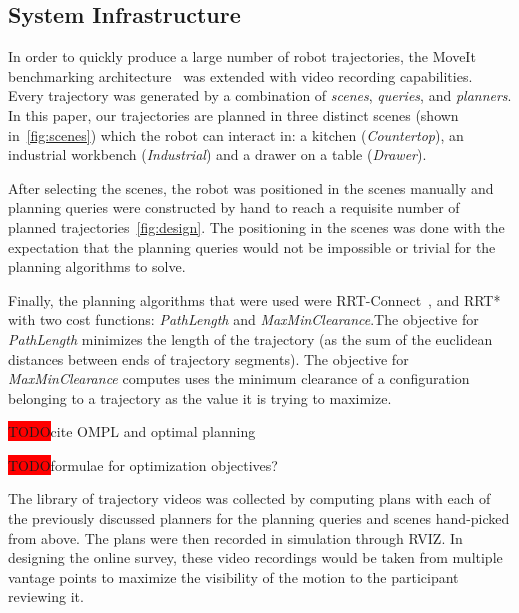 \documentclass[letterpaper, 10 pt, conference]{ieeeconf}  %
\newcommand{\todo}{\colorbox{red}{TODO}}
\begin{document}
\subsection{System Infrastructure}

In order to quickly produce a large number of robot trajectories, the MoveIt benchmarking architecture~\cite{cohen2012generic} was extended with video recording capabilities. Every trajectory was generated by a combination of \emph{scenes}, \emph{queries}, and \emph{planners}. In this paper, our trajectories are planned in three distinct scenes (shown in~\ref{fig:scenes}) which the robot can interact in: a kitchen (\emph{Countertop}), an industrial workbench (\emph{Industrial}) and a drawer on a table (\emph{Drawer}).


After selecting the scenes, the robot was positioned in the scenes manually and planning queries were constructed by hand to reach a requisite number of planned trajectories~\ref{fig:design}. The positioning in the scenes was done with the expectation that the planning queries would not be impossible or trivial for the planning algorithms to solve. 

Finally, the planning algorithms that were used were RRT-Connect~\cite{kuffner2000rrt}, and RRT*~\cite{frazzoli-RRTstar} with two cost functions: \emph{PathLength} and \emph{MaxMinClearance}.The objective for \emph{PathLength} minimizes the length of the trajectory (as the sum of the euclidean distances between ends of trajectory segments). The objective for \emph{MaxMinClearance} computes uses the minimum clearance of a configuration belonging to a trajectory as the value it is trying to maximize.

\todo cite OMPL and optimal planning

\todo formulae for optimization objectives?

The library of trajectory videos was collected by computing plans with each of the previously discussed planners for the planning queries and scenes hand-picked from above. The plans were then recorded in simulation through RVIZ. In designing the online survey, these video recordings would be taken from multiple vantage points to maximize the visibility of the motion to the participant reviewing it.
\end{document}
